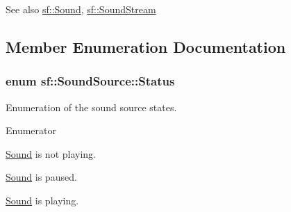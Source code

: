 \begin{DoxySeeAlso}{See also}
\hyperlink{classsf_1_1_sound}{sf\+::\+Sound}, \hyperlink{classsf_1_1_sound_stream}{sf\+::\+Sound\+Stream} 
\end{DoxySeeAlso}


\subsection{Member Enumeration Documentation}
\hypertarget{classsf_1_1_sound_source_ac43af72c98c077500b239bc75b812f03}{
\subsubsection[{Status}]{\setlength{\rightskip}{0pt plus 5cm}enum {\bf sf\+::\+Sound\+Source\+::\+Status}}}\label{classsf_1_1_sound_source_ac43af72c98c077500b239bc75b812f03}


Enumeration of the sound source states. 

\begin{Desc}
\item[Enumerator]\par
\begin{description}
\item[{\em 
\hypertarget{classsf_1_1_sound_source_ac43af72c98c077500b239bc75b812f03adabb01e8aa85b2f54b344890addf764a}{Stopped}\label{classsf_1_1_sound_source_ac43af72c98c077500b239bc75b812f03adabb01e8aa85b2f54b344890addf764a}
}]\hyperlink{classsf_1_1_sound}{Sound} is not playing. \item[{\em 
\hypertarget{classsf_1_1_sound_source_ac43af72c98c077500b239bc75b812f03ac3ca1fcc0394267c9bdbe3dc0a8a7e41}{Paused}\label{classsf_1_1_sound_source_ac43af72c98c077500b239bc75b812f03ac3ca1fcc0394267c9bdbe3dc0a8a7e41}
}]\hyperlink{classsf_1_1_sound}{Sound} is paused. \item[{\em 
\hypertarget{classsf_1_1_sound_source_ac43af72c98c077500b239bc75b812f03af07bdea9f70ef7606dfc9f955beeee18}{Playing}\label{classsf_1_1_sound_source_ac43af72c98c077500b239bc75b812f03af07bdea9f70ef7606dfc9f955beeee18}
}]\hyperlink{classsf_1_1_sound}{Sound} is playing. \end{description}
\end{Desc}


